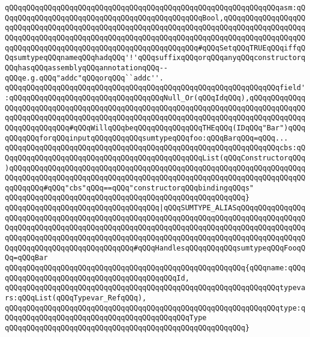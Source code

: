 \verb|qQQqqQQqqQQqqQQqqQQqqQQqqQQqqQQqqQQqqQQqqQQqqQQqqQQqqQQqqQQqqQQqasm:qQQqqQQqqQQqqQQqqQQqqQQqqQQqqQQqqQQqqQQqqQQqqQQqBool,qQQqqQQqqQQqqQQqqQQqqQQqqQQqqQQqqQQqqQQqqQQqqQQqqQQqqQQqqQQqqQQqqQQqqQQqqQQqqQQqqQQqqQQqqQQqqQQqqQQqqQQqqQQqqQQqqQQqqQQqqQQqqQQqqQQqqQQqqQQqqQQqqQQqqQQqqQQqqQQqqQQqqQQqqQQqqQQqqQQqqQQqqQQqqQQqqQQqqQQqqQQq#qQQqSetqQQqTRUEqQQqiffqQQqsumtypeqQQqnameqQQqhadqQQq'!'qQQqsuffixqQQqorqQQqanyqQQqconstructorqQQqhasqQQqassemblyqQQqannotationqQQq--qQQqe.g.qQQq"addc"qQQqorqQQq``addc''.|\newline
\verb|qQQqqQQqqQQqqQQqqQQqqQQqqQQqqQQqqQQqqQQqqQQqqQQqqQQqqQQqqQQqqQQqfield':qQQqqQQqqQQqqQQqqQQqqQQqqQQqqQQqqQQqNull_Or(qQQqIdqQQq),qQQqqQQqqQQqqQQqqQQqqQQqqQQqqQQqqQQqqQQqqQQqqQQqqQQqqQQqqQQqqQQqqQQqqQQqqQQqqQQqqQQqqQQqqQQqqQQqqQQqqQQqqQQqqQQqqQQqqQQqqQQqqQQqqQQqqQQqqQQqqQQqqQQqqQQqqQQqqQQqqQQqqQQq#qQQqWillqQQqbeqQQqqQQqqQQqqQQqTHEqQQq(IDqQQq"Bar")qQQqqQQqqQQqforqQQqinputqQQqqQQqqQQqsumtypeqQQqfoo:qQQqBarqQQq=qQQq...|\newline
\verb|qQQqqQQqqQQqqQQqqQQqqQQqqQQqqQQqqQQqqQQqqQQqqQQqqQQqqQQqqQQqqQQqcbs:qQQqqQQqqQQqqQQqqQQqqQQqqQQqqQQqqQQqqQQqqQQqqQQqList(qQQqConstructorqQQq)qQQqqQQqqQQqqQQqqQQqqQQqqQQqqQQqqQQqqQQqqQQqqQQqqQQqqQQqqQQqqQQqqQQqqQQqqQQqqQQqqQQqqQQqqQQqqQQqqQQqqQQqqQQqqQQqqQQqqQQqqQQqqQQqqQQqqQQqqQQqqQQqqQQq#qQQq"cbs"qQQq==qQQq"constructorqQQqbindingqQQqs"|\newline
\verb|qQQqqQQqqQQqqQQqqQQqqQQqqQQqqQQqqQQqqQQqqQQqqQQqqQQqqQQq}|\newline
\newline
\verb|qQQqqQQqqQQqqQQqqQQqqQQqqQQqqQQqqQQq|\verb#|qQQqSUMTYPE_ALIASqQQqqQQqqQQqqQQqqQQqqQQqqQQqqQQqqQQqqQQqqQQqqQQqqQQqqQQqqQQqqQQqqQQqqQQqqQQqqQQqqQQqqQQqqQQqqQQqqQQqqQQqqQQqqQQqqQQqqQQqqQQqqQQqqQQqqQQqqQQqqQQqqQQqqQQqqQQqqQQqqQQqqQQqqQQqqQQqqQQqqQQqqQQqqQQqqQQqqQQqqQQqqQQqqQQqqQQqqQQqqQQqqQQqqQQqqQQqqQQqqQQqqQQqqQQqqQQq#\verb|#qQQqHandlesqQQqqQQqqQQqsumtypeqQQqFooqQQq=qQQqBar|\newline
\verb|qQQqqQQqqQQqqQQqqQQqqQQqqQQqqQQqqQQqqQQqqQQqqQQqqQQqqQQq{qQQqname:qQQqqQQqqQQqqQQqqQQqqQQqqQQqqQQqqQQqqQQqqQQqId,|\newline
\verb|qQQqqQQqqQQqqQQqqQQqqQQqqQQqqQQqqQQqqQQqqQQqqQQqqQQqqQQqqQQqqQQqtypevars:qQQqList(qQQqTypevar_RefqQQq),|\newline
\verb|qQQqqQQqqQQqqQQqqQQqqQQqqQQqqQQqqQQqqQQqqQQqqQQqqQQqqQQqqQQqqQQqtype:qQQqqQQqqQQqqQQqqQQqqQQqqQQqqQQqqQQqqQQqqQQqType|\newline
\verb|qQQqqQQqqQQqqQQqqQQqqQQqqQQqqQQqqQQqqQQqqQQqqQQqqQQqqQQq}|\newline
